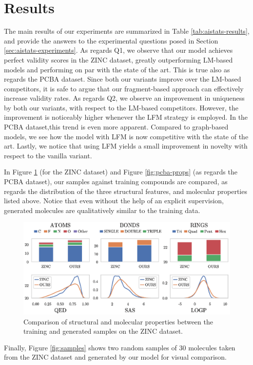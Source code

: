 \section{Results}
The main results of our experiments are summarized in Table \ref{tab:aistats-results}, and provide the answers to the experimental questions posed in Section \ref{sec:aistats-experiments}. As regards Q1, we observe that our model achieves perfect validity scores in the ZINC dataset, greatly outperforming LM-based models and performing on par with the state of the art. This is true also as regards the PCBA dataset. Since both our variants improve over the LM-based competitors, it is safe to argue that our fragment-based approach can effectively increase validity rates. As regards Q2, we observe an improvement in uniqueness by both our variants, with respect to the LM-based competitors. However, the improvement is noticeably higher whenever the LFM strategy is employed. In the PCBA dataset,this trend is even more apparent. Compared to graph-based models, we see how the model with LFM is now competitive with the state of the art. Lastly, we notice that using LFM yields a small improvement in novelty with respect to the vanilla variant.

In Figure \ref{fig:zinc-props} (for the ZINC dataset) and Figure \ref{fig:pcba-props} (as regards the PCBA dataset), our samples against training compounds are compared, as regards the distribution of the three structural features, and molecular properties listed above. Notice that even without the help of an explicit supervision, generated molecules are qualitatively similar to the training data.
\begin{figure}[h!]
    \centering
    \includegraphics[width=.95\textwidth]{Figures/Chapter7/props-zinc.eps}
    \caption{Comparison of structural and molecular properties between the training and generated samples on the ZINC dataset.}
    \label{fig:zinc-props}
\end{figure}
Finally, Figure \ref{fig:samples} shows two random samples of 30 molecules taken from the ZINC dataset and generated by our model for visual comparison.
